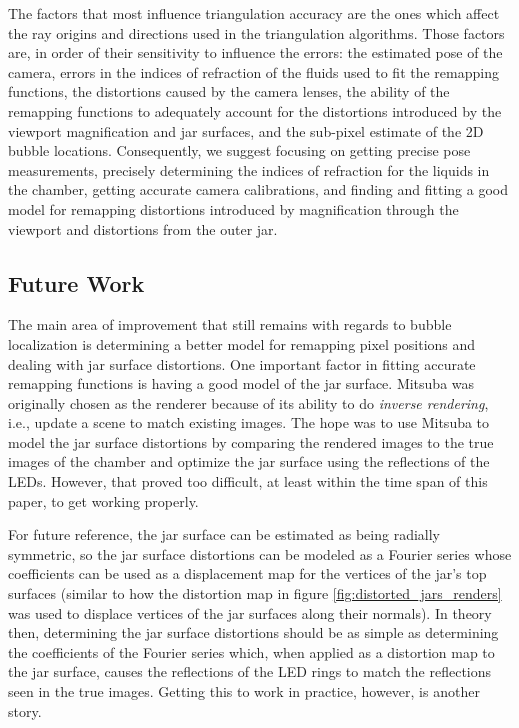 \documentclass[11pt, letterpaper]{extarticle} %
\begin{document}
The factors that most influence triangulation accuracy are the ones which affect the ray origins and directions used in the triangulation algorithms. Those factors are, in order of their sensitivity to influence the errors: the estimated pose of the camera, errors in the indices of refraction of the fluids used to fit the remapping functions, the distortions caused by the camera lenses, the ability of the remapping functions to adequately account for the distortions introduced by the viewport magnification and jar surfaces, and the sub-pixel estimate of the 2D bubble locations. Consequently, we suggest focusing on getting precise pose measurements, precisely determining the indices of refraction for the liquids in the chamber, getting accurate camera calibrations, and finding and fitting a good model for remapping distortions introduced by magnification through the viewport and distortions from the outer jar.

\subsection{Future Work} \label{subsec:future_work}
The main area of improvement that still remains with regards to bubble localization is determining a better model for remapping pixel positions and dealing with jar surface distortions. One important factor in fitting accurate remapping functions is having a good model of the jar surface. Mitsuba was originally chosen as the renderer because of its ability to do \textit{inverse rendering}, i.e., update a scene to match existing images. The hope was to use Mitsuba to model the jar surface distortions by comparing the rendered images to the true images of the chamber and optimize the jar surface using the reflections of the LEDs. However, that proved too difficult, at least within the time span of this paper, to get working properly. 

For future reference, the jar surface can be estimated as being radially symmetric, so the jar surface distortions can be modeled as a Fourier series whose coefficients can be used as a displacement map for the vertices of the jar's top surfaces (similar to how the distortion map in figure \ref{fig:distorted_jars_renders} was used to displace vertices of the jar surfaces along their normals). In theory then, determining the jar surface distortions should be as simple as determining the coefficients of the Fourier series which, when applied as a distortion map to the jar surface, causes the reflections of the LED rings to match the reflections seen in the true images. Getting this to work in practice, however, is another story.
\end{document}
